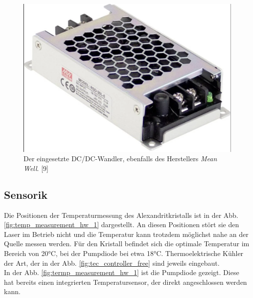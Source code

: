 \begin{figure}[H]
    \centering
    \includegraphics[scale=0.2, trim={2mm 2mm 2mm 2mm}, clip]{98_images/mean_well_dc_dc_converter.PNG}  
    \caption{Der eingesetzte DC/DC-Wandler, ebenfalls des Herstellers \textit{Mean Well}. [9]}
    \label{fig:dc_dc_wandler_hw}
\end{figure}

\subsection{Sensorik}
Die Positionen der Temperaturmessung des Alexandritkristalls ist in der Abb.\ref{fig:temp_measurement_hw_1} dargestellt. An diesen Positionen stört sie den Laser im Betrieb nicht und die Temperatur kann trotzdem möglichst nahe an der Quelle messen werden. Für den Kristall befindet sich die optimale Temperatur im Bereich von 20°C, bei der Pumpdiode bei etwa 18°C. Thermoelektrische Kühler der Art, der in der Abb. \ref{fig:tec_controller_free} sind jeweils eingebaut.\\

In der Abb. \ref{fig:termp_measurement_hw_1} ist die Pumpdiode gezeigt. Diese hat bereits einen integrierten Temperatursensor, der direkt angeschlossen werden kann.

